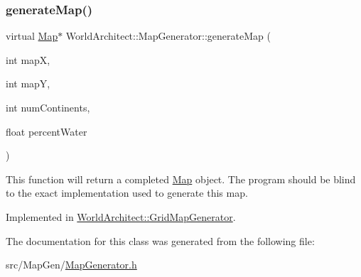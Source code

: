 \subsubsection{\texorpdfstring{generateMap()}{generateMap()}}
{\footnotesize\ttfamily virtual \mbox{\hyperlink{class_world_architect_1_1_map}{Map}}$\ast$ World\+Architect\+::\+Map\+Generator\+::generate\+Map (\begin{DoxyParamCaption}\item[{int}]{mapX,  }\item[{int}]{mapY,  }\item[{int}]{num\+Continents,  }\item[{float}]{percent\+Water }\end{DoxyParamCaption})\hspace{0.3cm}{\ttfamily [pure virtual]}}

This function will return a completed \mbox{\hyperlink{class_world_architect_1_1_map}{Map}} object. The program should be blind to the exact implementation used to generate this map. 

Implemented in \mbox{\hyperlink{class_world_architect_1_1_grid_map_generator_a7155387434e6d740c487eeade985f78d}{World\+Architect\+::\+Grid\+Map\+Generator}}.



The documentation for this class was generated from the following file\+:\begin{DoxyCompactItemize}
\item 
src/\+Map\+Gen/\mbox{\hyperlink{_map_generator_8h}{Map\+Generator.\+h}}\end{DoxyCompactItemize}
